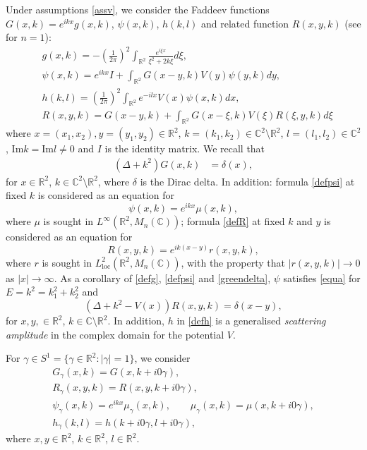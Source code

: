 \documentclass[11pt,a4paper,english,subeqn]{amsart}
\theoremstyle{plain}
\theoremstyle{definition}
\numberwithin{equation}{section}
\begin{document}
Under assumptions \eqref{assv}, we consider the Faddeev functions $G(x,k) = e^{ikx}g(x,k)$, $\psi(x,k)$, $h(k,l)$ and related function $R(x,y,k)$ (see \cite{F, F2, N1, N5} for $n=1$):
\begin{align} \label{defg}
&g(x,k)=-\left(\frac{1}{2 \pi}\right)^2 \int_{{\mathbb{R}}^2} \frac{e^{i\xi x}}{\xi^2 + 2k\xi}d \xi,\\ \label{defpsi}
&\psi(x,k)=e^{ikx}I + \int_{{\mathbb{R}}^2} G(x-y,k)V(y)\psi(y,k)dy, \\ \label{defh}
&h(k,l)= \left(\frac{1}{2 \pi}\right)^2 \int_{{\mathbb{R}}^2}e^{-ilx}V(x)\psi(x,k) dx,\\ \label{defR}
&R(x,y,k) = G(x-y,k)+\int_{{\mathbb{R}}^2} G(x-\xi,k)V(\xi)R(\xi,y,k) d\xi
\end{align}
where $x=(x_1,x_2), y=(y_1,y_2) \in {\mathbb{R}}^2$, $k=(k_1,k_2) \in {\mathbb{C}}^2 \setminus {\mathbb{R}}^2$, $l =(l_1,l_2) \in {\mathbb{C}}^2$, ${\mathrm{Im}} k = {\mathrm{Im}} l \neq 0$ and $I$ is the identity matrix.
We recall that
\begin{align} \label{greendelta}
(\Delta + k^2)G(x,k)&=\delta(x),
\end{align}
for $x \in {\mathbb{R}}^2$, $k \in {\mathbb{C}}^2 \setminus {\mathbb{R}}^2$, where $\delta$ is the Dirac delta.
In addition: formula \eqref{defpsi} at fixed $k$ is considered as an equation for
\begin{equation} \label{defmu}
\psi(x,k) = e^{ikx}\mu (x,k),
\end{equation}
where $\mu$ is sought in $L^{\infty}({\mathbb{R}}^2, {M_{n}({\mathbb{C}})})$; formula \eqref{defR} at fixed $k$ and $y$ is considered as an equation for
\begin{equation}
R(x,y,k) = e^{ik(x-y)}r(x,y,k),
\end{equation}
where $r$ is sought in $L^2_{\mathrm{loc}}({\mathbb{R}}^2, {M_{n}({\mathbb{C}})})$, with the property that $|r(x,y,k)| \to 0$ as $|x| \to \infty$.
As a corollary of \eqref{defg}, \eqref{defpsi} and \eqref{greendelta}, $\psi$ satisfies \eqref{equa} for $E = k^2 = k_1^2+k_2^2$ and 
\begin{equation}
(\Delta + k^2-V(x))R(x,y,k) = \delta(x-y),
\end{equation}
for $x,y, \in {\mathbb{R}}^2$, $k \in {\mathbb{C}} \setminus {\mathbb{R}}^2$.
In addition, $h$ in \eqref{defh} is a generalised \textit{scattering amplitude} in the complex domain for the potential $V$.

For $\gamma \in S^1 = \{ \gamma \in {\mathbb{R}}^2 : |\gamma| = 1 \}$, we consider
\begin{gather}
G_{\gamma}(x,k) = G(x,k + i0 \gamma), \\ \label{defRg}
R_{\gamma}(x,y,k) = R(x,y,k + i0 \gamma), \\ \label{defpsig}
\psi_{\gamma}(x,k) =e^{ikx}\mu_{\gamma}(x,k), \qquad \mu_{\gamma}(x,k) = \mu(x,k + i 0 \gamma), \\
h_{\gamma}(k,l) = h(k + i 0 \gamma, l + i0 \gamma),
\end{gather}
where $x,y \in {\mathbb{R}}^2$, $k \in {\mathbb{R}}^2$, $l \in {\mathbb{R}}^2$. 
\end{document}
